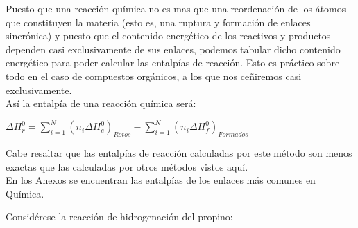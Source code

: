 Puesto que una reacción química no es mas que una reordenación de los átomos que constituyen la materia (esto es, una ruptura y formación de enlaces sincrónica) y puesto que el contenido energético de los reactivos y productos dependen casi exclusivamente de sus enlaces, podemos tabular dicho contenido energético para poder calcular las entalpías de reacción. Esto es práctico sobre todo en el caso de compuestos orgánicos, a los que nos ceñiremos casi exclusivamente. \\

Así la entalpía de una reacción química será:

\begin{center}
	$\Delta H^{0}_r = \displaystyle\sum_{i = 1}^{N}(n_i\Delta H^{0}_e)_{Rotos} - \displaystyle\sum_{i=1}^{N}(n_i\Delta H^{0}_f)_{Formados}$
\end{center}

Cabe resaltar que las entalpías de reacción calculadas por este método son menos exactas que las calculadas por otros métodos vistos aquí.\\

En los Anexos se encuentran las entalpías de los enlaces más comunes en Química.

\begin{exercise}
Considérese  la reacción de hidrogenación del propino:\\


\end{exercise}











